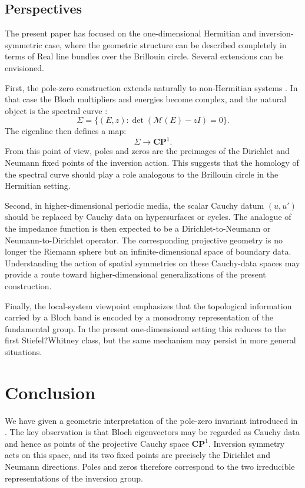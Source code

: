 \documentclass[preprint,12pt]{elsarticle}
\begin{document}
\subsection{Perspectives}

The present paper has focused on the one-dimensional Hermitian and inversion-symmetric case, where the geometric structure can be described completely in terms of Real line bundles over the Brillouin circle. Several extensions can be envisioned.

First, the pole-zero construction extends naturally to non-Hermitian systems \cite{FelbacqAnnalen}. In that case the Bloch multipliers and energies become complex, and the natural object is the spectral curve :
$$
\Sigma=\{(E,z):\det(\mathcal M(E)-zI)=0\}.
$$
The eigenline then defines a map:
$$
\Sigma\longrightarrow \mathbf{CP}^1.
$$
From this point of view, poles and zeros are the preimages of the Dirichlet and Neumann fixed points of the inversion action. This suggests that the homology of the spectral curve should play a role analogous to the Brillouin circle in the Hermitian setting.

Second, in higher-dimensional periodic media, the scalar Cauchy datum $(u,u')$ should be replaced by Cauchy data on hypersurfaces or cycles. The analogue of the impedance function is then expected to be a Dirichlet-to-Neumann or Neumann-to-Dirichlet operator. The corresponding projective geometry is no longer the Riemann sphere but an infinite-dimensional space of boundary data. Understanding the action of spatial symmetries on these Cauchy-data spaces may provide a route toward higher-dimensional generalizations of the present construction.

Finally, the local-system viewpoint emphasizes that the topological information carried by a Bloch band is encoded by a monodromy representation of the fundamental group. In the present one-dimensional setting this reduces to the first Stiefel?Whitney class, but the same mechanism may persist in more general situations.
\section{Conclusion}

We have given a geometric interpretation of the pole-zero invariant introduced in \cite{FelbacqAnnalen}. The key observation is that Bloch eigenvectors may be regarded as Cauchy data and hence as points of the projective Cauchy space $\mathbf{CP}^1$.
Inversion symmetry acts on this space, and its two fixed points are precisely the Dirichlet and Neumann directions. Poles and zeros therefore correspond to the two irreducible representations of the inversion group.
\end{document}
